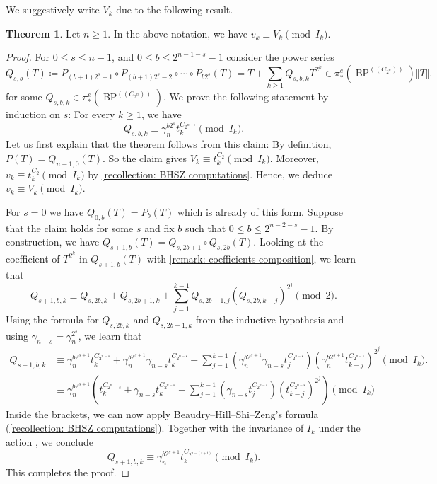 \documentclass[a4paper, 10pt]{article}
\newcommand{\BP}{\operatorname{BP}}
\theoremstyle{definition}
\newtheorem{theorem}[theorem]{Theorem}
\begin{document}
We suggestively write $V_k$ due to the following result.

\begin{theorem} \label{theorem: vk is Vk}
    Let $n \geq 1$. In the above notation, we have \(v_k\equiv V_k \pmod{I_k}\). 
\end{theorem}
\begin{proof}
    For \(0\leq s\leq n-1\), and \(0\leq b\leq 2^{n-1-s}-1\)
    consider the power series
    \[
    Q_{s,b}(T)\coloneqq P_{(b+1)2^s-1}\circ P_{(b+1)2^s-2}\circ \cdots   \circ P_{b2^s}(T)= T+\sum_{k\geq 1}Q_{s,b,k}T^{2^k} \in \pi_*^e(\BP^{( \! ( C_{2^n}) \! )}) \llbracket T \rrbracket.
    \]
    for some $Q_{s,b,k} \in \pi_*^e(\BP^{( \! ( C_{2^n} ) \! )})$. We prove the following statement by induction on $s$: 
    For every \(k\geq 1\), we have
    \[
    Q_{s,b,k}\equiv \gamma_n^{b2^s}t_k^{C_{2^{n-s}}} \pmod{I_k}.
    \]
    Let us first explain that the theorem follows from this claim: By definition, \(P(T)=Q_{n-1,0}(T)\). So the claim gives \(V_k\equiv t_k^{C_2} \pmod{I_k}\). Moreover, \(v_k\equiv t_k^{C_2} \pmod{I_k} \) by \cref{recollection: BHSZ computations}. Hence, we deduce \(v_k\equiv V_k \pmod{I_k}\). 

    For $s = 0$ we have $Q_{0,b}(T) = P_b(T)$ which is already of this form. Suppose that the claim holds for some \(s\) and fix \(b\) such that \(0\leq b \leq 2^{n-2-s}-1\).
    By construction, we have \(Q_{s+1,b}(T)=Q_{s,2b+1}\circ Q_{s,2b}(T)\).
    Looking at the coefficient of \(T^{2^k}\) in \(Q_{s+1,b}(T)\) with \cref{remark: coefficients composition}, we learn that
    \[
    Q_{s+1,b,k}
    \equiv
    Q_{s,2b,k}
    +
    Q_{s,2b+1,k}
    +
    \sum_{j=1}^{k-1}
    Q_{s,2b+1,j}
    \left(Q_{s,2b,k-j}\right)^{2^j} \pmod{2}.
    \]
    Using the formula for \(Q_{s,2b,k}\) and \(Q_{s,2b+1,k}\) from the inductive hypothesis and using $\gamma_{n-s} = \gamma_n^{2^s}$, we learn that
    \begin{align*}
        Q_{s+1,b,k} &\equiv
    \gamma_n^{b2^{s+1}}t_k^{C_{2^{n-s}}}
    +
    \gamma_n^{b2^{s+1}}\gamma_{n-s}t_k^{C_{2^{n-s}}}
    +
    \sum_{j=1}^{k-1}
    \left(\gamma_n^{b2^{s+1}}\gamma_{n-s}t_j^{C_{2^{n-s}}}\right)
    \left(\gamma_n^{b2^{s+1}}t_{k-j}^{C_{2^{n-s}}}\right)^{2^j}
    \pmod{I_k}.
    \\ &\equiv \gamma_n^{b2^{s+1}} \left( t_k^{C_{2^n-s}} + \gamma_{n-s} t_k^{C_{2^{n-s}}} + \sum_{j=1}^{k-1}
    \left(\gamma_{n-s}t_j^{C_{2^{n-s}}}\right)
    \left(t_{k-j}^{C_{2^{n-s}}}\right)^{2^j} \right) \pmod{I_k}
    \end{align*}
    Inside the brackets, we can now apply Beaudry--Hill--Shi--Zeng's formula (\cref{recollection: BHSZ computations}). Together with the invariance of \(I_k\) under the action \cite[Proposition 3.7]{beaudryHillShiZeng2021modelsLubinTate}, we conclude
    \[
    Q_{s+1,b,k}\equiv
    \gamma_n^{b2^{s+1}}t_k^{C_{2^{n-(s+1)}}} \pmod{I_k}.
    \]
    This completes the proof.
\end{proof}
\end{document}

